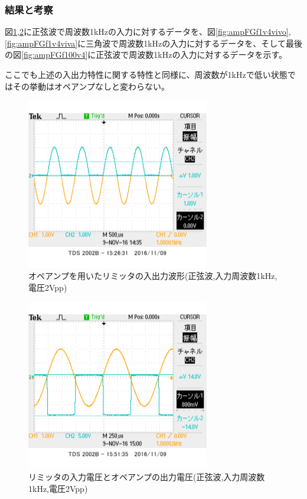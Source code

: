 \documentclass[11pt,a4j]{jsarticle}
\begin{document}
   \subsubsection{結果と考察}
    図\ref{fig:ampFGf1v2vivo},\ref{fig:ampFGf1v2viva}に正弦波で周波数1kHzの入力に対するデータを、図\ref{fig:ampFGf1v4vivo},\ref{fig:ampFGf1v4viva}に三角波で周波数1kHzの入力に対するデータを、そして最後の図\ref{fig:ampFGf100v4}に正弦波で周波数1kHzの入力に対するデータを示す。
    
    ここでも上述の入出力特性に関する特性と同様に、周波数が1kHzで低い状態ではその挙動はオペアンプなしと変わらない。
    
    \begin{figure}[htbp]
  \centering
  \includegraphics[width=8cm,clip]{1_1_ampFG_f1V2_ViVo.png}
  \caption{オペアンプを用いたリミッタの入出力波形(正弦波,入力周波数1kHz,電圧2Vpp)}
  \label{fig:ampFGf1v2vivo}
 \end{figure}%
 
 \begin{figure}[htbp]
  \centering
  \includegraphics[width=8cm,clip]{1_1_ampFG_f1V2_ViVa.png}
  \caption{リミッタの入力電圧とオペアンプの出力電圧(正弦波,入力周波数1kHz,電圧2Vpp)}
  \label{fig:ampFGf1v2viva}
 \end{figure}%
 
\end{document}
